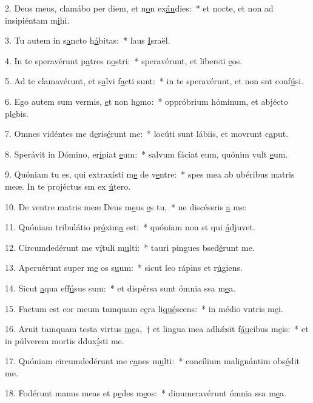 2. Deus meus, clamábo per diem, et n\uline{o}n ex\uline{áu}dies:~* et nocte, et non ad insipiéntam m\uline{i}hi.\par 
3. Tu autem in s\uline{a}ncto h\uline{á}bitas:~* laus \uline{I}sraël.\par 
4. In te speravérunt p\uline{a}tres n\uline{o}stri:~* speravérunt, et libersti \uline{e}os.\par 
5. Ad te clamavérunt, et s\uline{a}lvi f\uline{a}cti sunt:~* in te speravérunt, et non snt conf\uline{ú}si.\par 
6. Ego autem sum vermis, \uline{e}t non h\uline{o}mo:~* oppróbrium hóminum, et abjécto pl\uline{e}bis.\par 
7. Omnes vidéntes me d\uline{e}ris\uline{é}runt me:~* locúti sunt lábiis, et movrunt c\uline{a}put.\par 
8. Sperávit in Dómino, er\uline{í}piat \uline{e}um:~* salvum fáciat eum, quónim vult \uline{e}um.\par 
9. Quóniam tu es, qui extraxísti m\uline{e} de v\uline{e}ntre:~* spes mea ab ubéribus matris meæ. In te projéctus sm ex \uline{ú}tero.\par 
10. De ventre matris meæ Deus m\uline{e}us \uline{e}s tu,~* ne discéssris \uline{a} me:\par 
11. Quóniam tribulátio pr\uline{ó}xim\uline{a} est:~* quóniam non st qui \uline{á}djuvet.\par 
12. Circumdedérunt me v\uline{í}tuli m\uline{u}lti:~* tauri pingues bsed\uline{é}runt me.\par 
13. Aperuérunt super m\uline{e} os s\uline{u}um:~* sicut leo rápins et r\uline{ú}giens.\par 
14. Sicut \uline{a}qua eff\uline{ú}sus sum:~* et dispérsa sunt ómnia ssa m\uline{e}a.\par 
15. Factum est cor meum tamquam c\uline{e}ra li\uline{qué}scens:~* in médio vntris m\uline{e}i.\par 
16. Aruit tamquam testa virtus \uline{me}a,~† et lingua mea adhǽsit f\uline{áu}cibus m\uline{e}is:~* et in púlverem mortis ddux\uline{í}sti me.\par 
17. Quóniam circumdedérunt me c\uline{a}nes m\uline{u}lti:~* concílium malignántim obs\uline{é}dit me.\par 
18. Fodérunt manus meas et p\uline{e}des m\uline{e}os:~* dinumeravérunt ómnia ssa m\uline{e}a.\par 
